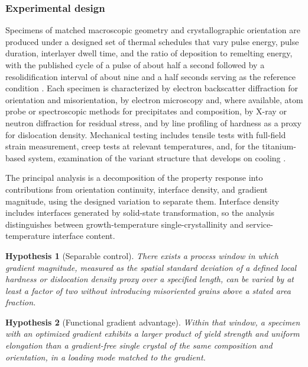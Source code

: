 \documentclass[11pt]{article}
\newtheorem{hypothesis}{Hypothesis}
\theoremstyle{definition}
\begin{document}
\subsubsection*{Experimental design}

Specimens of matched macroscopic geometry and crystallographic orientation are produced under a designed set of thermal schedules that vary pulse energy, pulse duration, interlayer dwell time, and the ratio of deposition to remelting energy, with the published cycle of a pulse of about half a second followed by a resolidification interval of about nine and a half seconds serving as the reference condition \cite{rohrer2026}. Each specimen is characterized by electron backscatter diffraction for orientation and misorientation, by electron microscopy and, where available, atom probe or spectroscopic methods for precipitates and composition, by X-ray or neutron diffraction for residual stress, and by line profiling of hardness as a proxy for dislocation density. Mechanical testing includes tensile tests with full-field strain measurement, creep tests at relevant temperatures, and, for the titanium-based system, examination of the variant structure that develops on cooling \cite{rohrer2026}.

The principal analysis is a decomposition of the property response into contributions from orientation continuity, interface density, and gradient magnitude, using the designed variation to separate them. Interface density includes interfaces generated by solid-state transformation, so the analysis distinguishes between growth-temperature single-crystallinity and service-temperature interface content.

\begin{hypothesis}[Separable control]
\label{hyp:separable}
There exists a process window in which gradient magnitude, measured as the spatial standard deviation of a defined local hardness or dislocation density proxy over a specified length, can be varied by at least a factor of two without introducing misoriented grains above a stated area fraction.
\end{hypothesis}

\begin{hypothesis}[Functional gradient advantage]
\label{hyp:gradientadv}
Within that window, a specimen with an optimized gradient exhibits a larger product of yield strength and uniform elongation than a gradient-free single crystal of the same composition and orientation, in a loading mode matched to the gradient.
\end{hypothesis}
\end{document}
